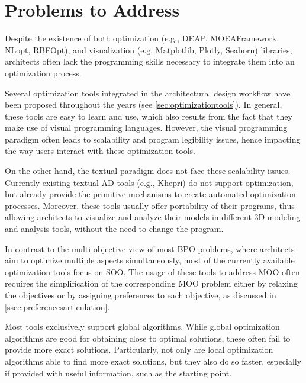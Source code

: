 	
	\section{Problems to Address}
	\label{sec:problemsaddress}
	
	Despite the existence of both optimization  (e.g., DEAP, MOEAFramework, NLopt, RBFOpt), and visualization (e.g. Matplotlib, Plotly, Seaborn) libraries, architects often lack the programming skills necessary to integrate them into an optimization process. 
	
	Several optimization tools integrated in the architectural design workflow have been proposed throughout the years (see \cref{sec:optimizationtools}). In general, these tools are easy to learn and use, which also results from the fact that they make use of visual programming languages. However, the visual programming paradigm often leads to scalability and program legibility issues, hence impacting the way users interact with these optimization tools. 
	
	On the other hand, the textual paradigm does not face these scalability issues. Currently existing textual \ac{AD} tools (e.g., Khepri) do not support optimization, but already provide the primitive mechanisms to create automated optimization processes. Moreover, these tools usually offer portability of their programs, thus allowing architects to visualize and analyze their models in different 3D modeling and analysis tools, without the need to change the program.
	
	In contrast to the multi-objective view of most \ac{BPO} problems, where architects aim to optimize multiple aspects simultaneously, most of the currently available optimization tools focus on \ac{SOO}. The usage of these tools to address \ac{MOO} often requires the simplification of the corresponding \ac{MOO} problem either by relaxing the objectives or by assigning preferences to each objective, as discussed in \cref{ssec:preferencesarticulation}.
	
	Most tools exclusively support global algorithms. While global optimization algorithms are good for obtaining close to optimal solutions, these often fail to provide more exact solutions. Particularly, not only are local optimization algorithms able to find more exact solutions, but they also do so faster, especially if provided with useful information, such as the starting point.
	
